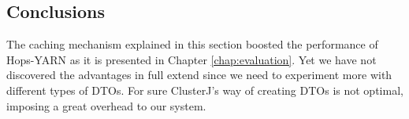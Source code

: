\subsection{Conclusions}
\label{ssec:impl_dto_caching_conslusions}
The caching mechanism explained in this section boosted the
performance of Hops-YARN as it is presented in Chapter \ref{chap:evaluation}. Yet
we have not discovered the advantages in full extend since we need to
experiment more with different types of DTOs. For sure ClusterJ's way
of creating DTOs is not optimal, imposing a great overhead to our system.